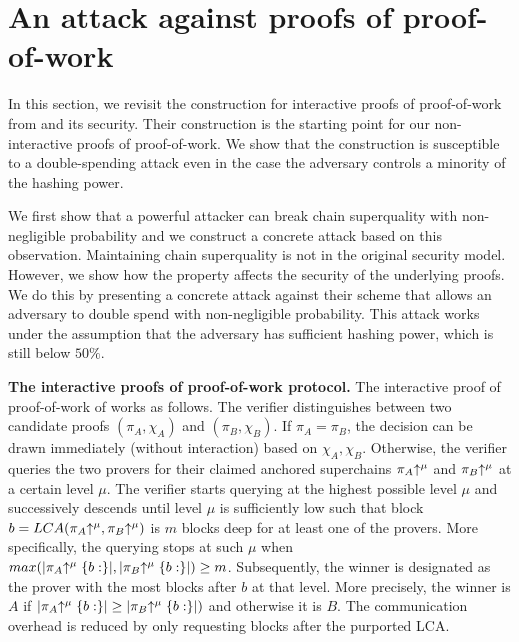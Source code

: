 \section{An attack against proofs of proof-of-work}

In this section, we revisit the construction for interactive proofs of
proof-of-work from \cite{KLS} and its security.  Their construction is the
starting point for our non-interactive proofs of proof-of-work. We show that the
construction is susceptible to  a double-spending attack even in the case the
adversary controls a minority of the hashing power.

We first show that a powerful attacker can break chain superquality with
non-negligible probability and we construct a concrete attack based on this
observation. Maintaining chain superquality is not in the original
security model. However, we show how the property affects the security of the
underlying proofs. We do this by presenting a concrete attack against their
scheme that allows an adversary to double spend with non-negligible probability.
This attack works under the assumption that the adversary has sufficient hashing
power, which is still below $50\%$.

\textbf{The interactive proofs of proof-of-work protocol.}
The interactive proof of proof-of-work of \cite{KLS} works as follows. The
verifier distinguishes between two candidate proofs $(\pi_A, \chi_A)$ and
$(\pi_B, \chi_B)$. If $\pi_A = \pi_B$, the decision can be drawn immediately
(without interaction) based on $\chi_A,\chi_B$. Otherwise, the verifier queries
the two provers for their claimed anchored superchains $\pi_A\negthickspace\uparrow^\mu$ and
$\pi_B\negthickspace\uparrow^\mu$ at a certain level $\mu$. The verifier starts querying at
the highest possible level $\mu$ and successively descends until level $\mu$ is
sufficiently low such that block $b = LCA(\pi_A\negthickspace\uparrow^\mu, \pi_B\negthickspace\uparrow^\mu)$
is $m$ blocks deep for at least one of the provers. More specifically, the
querying stops at such $\mu$ when $max(|\pi_A\negthickspace\uparrow^\mu\{b:\}|,
|\pi_B\negthickspace\uparrow^\mu\{b:\}|) \geq m$. Subsequently, the winner is designated as
the prover with the most blocks after $b$ at that level. More precisely, the
winner is $A$ if $|\pi_A\negthickspace\uparrow^\mu\{b:\}| \geq |\pi_B\negthickspace\uparrow^\mu\{b:\}|)$ and
otherwise it is $B$. The communication overhead is reduced by only requesting
blocks after the purported LCA.

